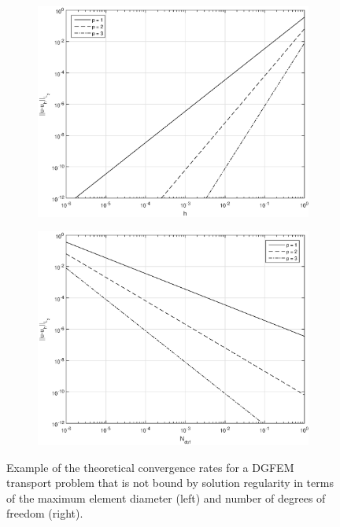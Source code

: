 \begin{figure}
\centering
	\begin{subfigure}[b]{0.495\textwidth}
		\centering
		\includegraphics[width=\textwidth]{figures/sec_Sn/hConverge.eps}
	\end{subfigure}
	\begin{subfigure}[b]{0.495\textwidth}
		\centering
		\includegraphics[width=\textwidth]{figures/sec_Sn/NConverge.eps}
	\end{subfigure}
\caption{Example of the theoretical convergence rates for a DGFEM transport problem that is not bound by solution regularity in terms of the maximum element diameter (left) and number of degrees of freedom (right).}
\label{fig::Sn_Spatial_Convergence}
\end{figure}
